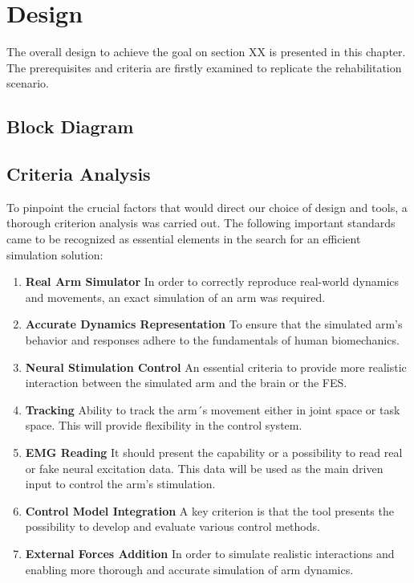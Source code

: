 \chapter{Design}
The overall design to achieve the goal on section XX is presented in this chapter. The prerequisites and criteria are firstly examined to replicate the rehabilitation scenario.

\section{Block Diagram}
\section{Criteria Analysis}

To pinpoint the crucial factors that would direct our choice of design and tools, a thorough criterion analysis was carried out. The following important standards came to be recognized as essential elements in the search for an efficient simulation solution:

\begin{enumerate}
    \item \textbf{Real Arm Simulator} In order to correctly reproduce real-world dynamics and movements, an exact simulation of an arm was required.
    \item \textbf{Accurate Dynamics Representation} To ensure that the simulated arm's behavior and responses adhere to the fundamentals of human biomechanics.
    \item \textbf{Neural Stimulation Control} An essential criteria to provide more realistic interaction between the simulated arm and the brain or the FES.
    \item \textbf{Tracking} Ability to track the arm´s movement either in joint space or task space. This will provide flexibility in the control system.
    \item \textbf{EMG Reading} It should present the capability or a possibility to read real or fake neural excitation data. This data will be used as the main driven input to control the arm's stimulation.
    \item \textbf{Control Model Integration} A key criterion is that the tool presents the possibility to develop and evaluate various control methods.
    \item \textbf{External Forces Addition} In order to simulate realistic interactions and enabling more thorough and accurate simulation of arm dynamics.
    
\end{enumerate}



